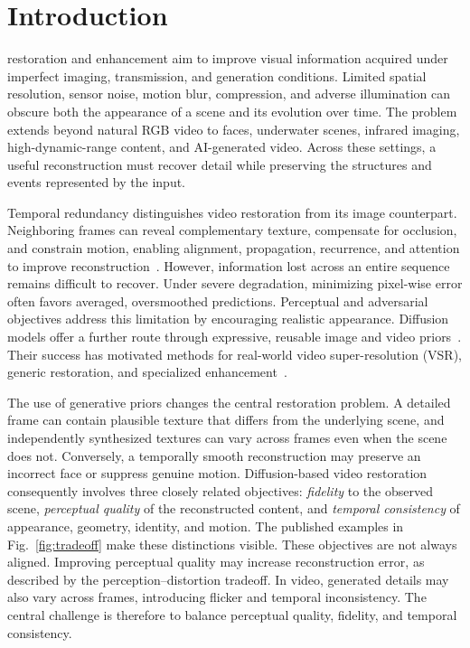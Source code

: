 \section{Introduction}
\label{sec:intro}
 restoration and enhancement aim to improve visual information acquired under imperfect imaging, transmission, and generation conditions. Limited spatial resolution, sensor noise, motion blur, compression, and adverse illumination can obscure both the appearance of a scene and its evolution over time. The problem extends beyond natural RGB video to faces, underwater scenes, infrared imaging, high-dynamic-range content, and AI-generated video. Across these settings, a useful reconstruction must recover detail while preserving the structures and events represented by the input.

Temporal redundancy distinguishes video restoration from its image counterpart. Neighboring frames can reveal complementary texture, compensate for occlusion, and constrain motion, enabling alignment, propagation, recurrence, and attention to improve reconstruction~\cite{vrsurvey,realbasicvsr}. However, information lost across an entire sequence remains difficult to recover. Under severe degradation, minimizing pixel-wise error often favors averaged, oversmoothed predictions. Perceptual and adversarial objectives address this limitation by encouraging realistic appearance. Diffusion models offer a further route through expressive, reusable image and video priors~\cite{ddpm,ldm,svd,wan}. Their success has motivated methods for real-world video super-resolution (VSR), generic restoration, and specialized enhancement~\cite{upscale,stablevsr,seedvr,undive}.

The use of generative priors changes the central restoration problem. A detailed frame can contain plausible texture that differs from the underlying scene, and independently synthesized textures can vary across frames even when the scene does not. Conversely, a temporally smooth reconstruction may preserve an incorrect face or suppress genuine motion. Diffusion-based video restoration consequently involves three closely related objectives: \emph{fidelity} to the observed scene, \emph{perceptual quality} of the reconstructed content, and \emph{temporal consistency} of appearance, geometry, identity, and motion. The published examples in Fig.~\ref{fig:tradeoff} make these distinctions visible. These objectives are not always aligned. Improving perceptual quality may increase reconstruction error, as described by the perception–distortion tradeoff. In video, generated details may also vary across frames, introducing flicker and temporal inconsistency. The central challenge is therefore to balance perceptual quality, fidelity, and temporal consistency.

